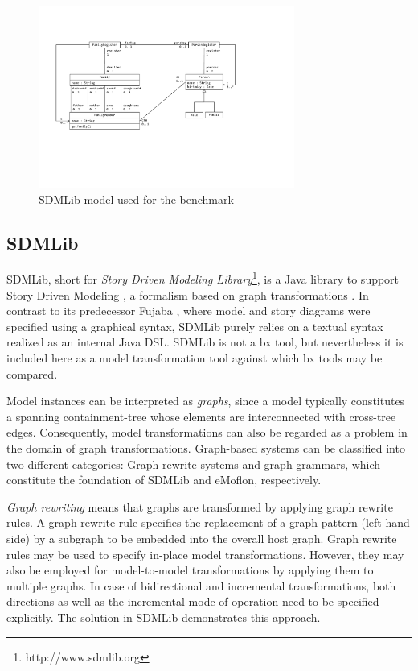

\begin{figure}[htb!]
	\centering
	\includegraphics[width=0.75\textwidth]{diagrams/solutions/SDMLibModel}
	\caption{SDMLib model used for the benchmark}
	\label{fig:SDMLibModel}
\end{figure}

\subsection{SDMLib}
\label{sec:SDMLib}


SDMLib, short for \emph{Story Driven Modeling Library}\footnote{http://www.sdmlib.org}, is a Java library to support Story Driven Modeling \cite{Norbisrath2013}, a formalism based on graph transformations \cite{Ehrig2006}. In contrast to its predecessor Fujaba \cite{Nickel2000}, where model and story diagrams were specified using a graphical syntax, SDMLib purely relies on a textual syntax realized as an internal Java DSL. SDMLib is not a bx tool, but nevertheless it is included here as a model transformation tool against which bx tools may be compared. 

Model instances can be interpreted as \emph{graphs}, since a model typically constitutes a spanning containment-tree whose elements are interconnected with cross-tree edges. Consequently, model transformations can also be regarded as a problem in the domain of graph transformations. Graph-based systems can be classified into two different categories: Graph-rewrite systems and graph grammars, which constitute the foundation of SDMLib and eMoflon, respectively. 

\emph{Graph rewriting} means that graphs are transformed by applying graph rewrite rules. A graph rewrite rule specifies the replacement of a graph pattern (left-hand side) by a subgraph to be embedded into the overall host graph. Graph rewrite rules may be used to specify in-place model transformations. However, they may also be employed for model-to-model transformations by applying them to multiple graphs. In case of bidirectional and incremental transformations, both directions as well as the incremental mode of operation need to be specified explicitly. The solution in SDMLib demonstrates this approach.

